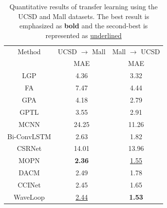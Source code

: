 \documentclass[lettersize,journal]{IEEEtran}
\begin{document}
\begin{table}[h]
\caption{Quantitative results of transfer learning using the UCSD and Mall datasets. The best result is emphasized as \textbf{bold} and the second-best is represented as \underline{underlined}}
  \centering
\scriptsize
    \begin{tabular}[]{ccc}
    \toprule
    Method & UCSD $\rightarrow$ Mall & Mall $\rightarrow$ UCSD  \\
     & MAE & MAE  \\
    \midrule
    LGP \cite{yu2005learning} & 4.36 & 3.32  \\     
    FA \cite{change2013semi} & 7.47 & 4.44 \\ 
    GPA \cite{liu2015bayesian} & 4.18 & 2.79  \\  
    GPTL \cite{liu2015bayesian} & 3.55 & 2.91  \\
    MCNN \cite{zhang2016single} & 24.25 & 11.26  \\
    Bi-ConvLSTM \cite{xiong2017spatiotemporal} & 2.63 & 1.82  \\
    CSRNet \cite{li2018csrnet} & 14.01 & 13.96 \\ 
    MOPN \cite{hossain2020video} & \textbf{2.36} & \underline{1.55} \\
    DACM \cite{ling2025dual} & 2.49 & 1.78 \\
    CCINet \cite{ling2026cascaded} & 2.45 &  1.65 \\
    \midrule
    WaveLoop & \underline{2.44} &  \textbf{1.53} \\
    \bottomrule
    \end{tabular}
\label{tab:7}
\vspace{-1em}
\end{table}
\end{document}
